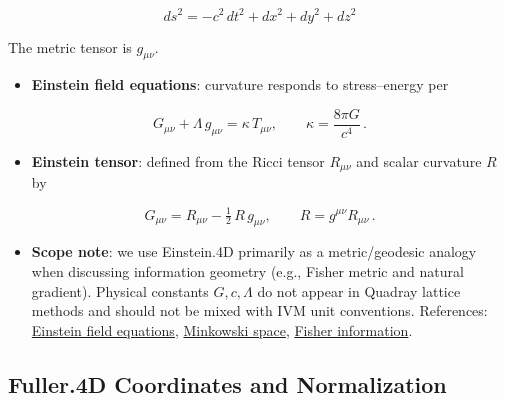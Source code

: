 \documentclass[
  10pt,
]{article}
\providecommand{\tightlist}{%
  \setlength{\itemsep}{0pt}\setlength{\parskip}{0pt}}
\begin{document}
\begin{equation}\label{eq:einstein_line_element_methods}
ds^2 = -c^2\,dt^2 + dx^2 + dy^2 + dz^2
\end{equation}

The metric tensor is \(g_{\mu\nu}\).

\begin{itemize}
\tightlist
\item
  \textbf{Einstein field equations}: curvature responds to
  stress--energy per
\end{itemize}

\begin{equation}\label{eq:efe}
G_{\mu \nu} + \Lambda\, g_{\mu \nu} = \kappa\, T_{\mu \nu},\qquad \kappa = \frac{8\pi G}{c^4}\,.
\end{equation}

\begin{itemize}
\tightlist
\item
  \textbf{Einstein tensor}: defined from the Ricci tensor \(R_{\mu\nu}\)
  and scalar curvature \(R\) by
\end{itemize}

\begin{equation}\label{eq:einstein_tensor}
G_{\mu \nu} = R_{\mu \nu} - \tfrac{1}{2}\,R\, g_{\mu \nu},\qquad R = g^{\mu\nu} R_{\mu\nu}\,.
\end{equation}

\begin{itemize}
\tightlist
\item
  \textbf{Scope note}: we use Einstein.4D primarily as a metric/geodesic
  analogy when discussing information geometry (e.g., Fisher metric and
  natural gradient). Physical constants \(G,c,\Lambda\) do not appear in
  Quadray lattice methods and should not be mixed with IVM unit
  conventions. References:
  \href{https://en.wikipedia.org/wiki/Einstein_field_equations}{Einstein
  field equations},
  \href{https://en.wikipedia.org/wiki/Minkowski_space}{Minkowski space},
  \href{https://en.wikipedia.org/wiki/Fisher_information}{Fisher
  information}.
\end{itemize}

\hypertarget{fuller.4d-coordinates-and-normalization}{%
\subsection{Fuller.4D Coordinates and
Normalization}\label{fuller.4d-coordinates-and-normalization}}
\end{document}
